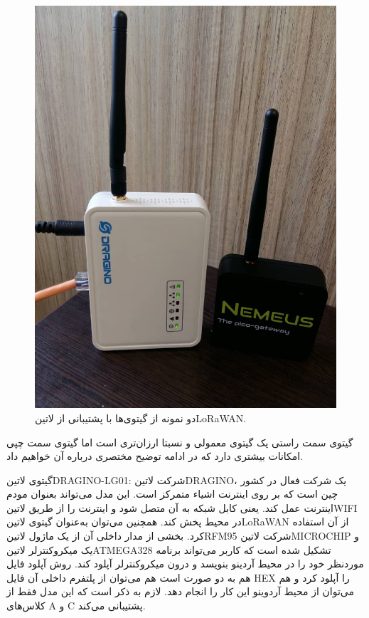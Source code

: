 \begin{figure}[!h]
	\centering
	\includegraphics[width=\linewidth]{Assets/lorawangateway.png}
	\caption{دو نمونه از گیتوی‌ها با پشتیبانی از ‌لاتین{LoRaWAN}.}
	\label{fig:lorawangateway}
\end{figure}

گیتوی سمت راستی یک گیتوی معمولی و نسبتا ارزان‌تری است اما گیتوی سمت چپی امکانات بیشتری دارد که در ادامه توضیح مختصری درباره آن خواهیم داد.

گیتوی ‌لاتین{DRAGINO-LG01}: شرکت ‌لاتین{DRAGINO}، یک شرکت فعال در کشور چین است که بر روی اینترنت اشیاء متمرکز است. این مدل می‌تواند بعنوان مودم اینترنت عمل کند. یعنی کابل شبکه به آن متصل شود و اینترنت را از طریق ‌لاتین{WIFI} در محیط پخش کند. همچنین می‌توان به‌عنوان گیتوی ‌لاتین{LoRaWAN} از آن استفاده کرد. بخشی از مدار داخلی آن از یک ماژول ‌لاتین{RFM95} شرکت ‌لاتین{MICROCHIP} و یک میکروکنترلر ‌لاتین{ATMEGA328} تشکیل شده است که کاربر می‌تواند برنامه موردنظر خود را در محیط آردینو بنویسد و درون میکروکنترلر آپلود کند. روش آپلود فایل هم به دو صورت است هم می‌توان از پلتفرم داخلی آن فایل HEX را آپلود کرد و هم می‌توان از محیط آردوینو این کار را انجام دهد. لازم به ذکر است که این مدل فقط از کلاس‌های A و C پشتیبانی می‌کند.


